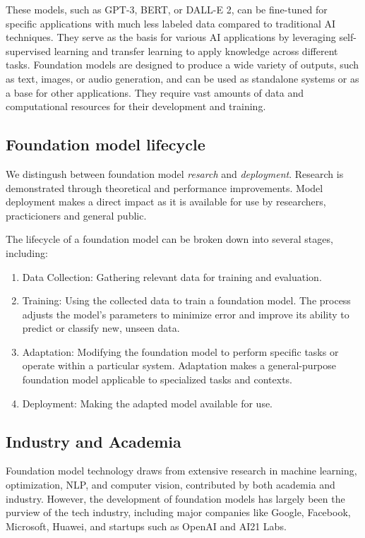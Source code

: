 \documentclass[acmsmall,authorversion]{acmart}
\begin{document}
These models, such as GPT-3, BERT, or DALL-E 2, can be fine-tuned for specific applications with much less labeled data compared to traditional AI techniques. They serve as the basis for various AI applications by leveraging self-supervised learning and transfer learning to apply knowledge across different tasks. Foundation models are designed to produce a wide variety of outputs, such as text, images, or audio generation, and can be used as standalone systems or as a base for other applications. They require vast amounts of data and computational resources for their development and training.

\subsection{Foundation model lifecycle}

We distingush between foundation model \textit{resarch} and \textit{deployment}. Research is demonstrated through theoretical and performance improvements. Model deployment makes a direct impact as it is available for use by researchers, practicioners and general public.

The lifecycle of a foundation model can be broken down into several stages, including:

\begin{enumerate}
    \item Data Collection: Gathering relevant data for training and evaluation.
    \item Training: Using the collected data to train a foundation model. The process adjusts the model's parameters to minimize error and improve its ability to predict or classify new, unseen data.
    \item Adaptation: Modifying the foundation model to perform specific tasks or operate within a particular system. Adaptation makes a general-purpose foundation model applicable to specialized tasks and contexts.
    \item Deployment: Making the adapted model available for use.
\end{enumerate}


\subsection{Industry and Academia}

Foundation model technology draws from extensive research in machine learning, optimization, NLP, and computer vision, contributed by both academia and industry. However, the development of foundation models has largely been the purview of the tech industry, including major companies like Google, Facebook, Microsoft, Huawei, and startups such as OpenAI and AI21 Labs.
\end{document}
